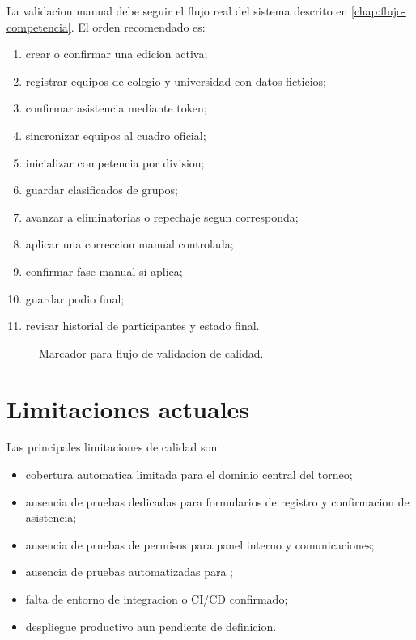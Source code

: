 La validacion manual debe seguir el flujo real del sistema descrito en \cref{chap:flujo-competencia}. El orden recomendado es:

\begin{enumerate}
  \item crear o confirmar una edicion activa;
  \item registrar equipos de colegio y universidad con datos ficticios;
  \item confirmar asistencia mediante token;
  \item sincronizar equipos al cuadro oficial;
  \item inicializar competencia por division;
  \item guardar clasificados de grupos;
  \item avanzar a eliminatorias o repechaje segun corresponda;
  \item aplicar una correccion manual controlada;
  \item confirmar fase manual si aplica;
  \item guardar podio final;
  \item revisar historial de participantes y estado final.
\end{enumerate}

\begin{figure}[H]
  \centering
  \caption{Marcador para flujo de validacion de calidad.}
  \label{fig:pruebas-flujo-validacion}
\end{figure}

\section{Limitaciones actuales}
\label{sec:pruebas-limitaciones}

Las principales limitaciones de calidad son:

\begin{itemize}
  \item cobertura automatica limitada para el dominio central del torneo;
  \item ausencia de pruebas dedicadas para formularios de registro y confirmacion de asistencia;
  \item ausencia de pruebas de permisos para panel interno y comunicaciones;
  \item ausencia de pruebas automatizadas para ;
  \item falta de entorno de integracion o CI/CD confirmado;
  \item despliegue productivo aun pendiente de definicion.
\end{itemize}

